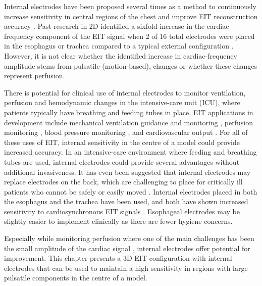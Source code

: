 

Internal electrodes have been proposed several times as a method to 
continuously increase sensitivity in central regions of the 
chest and improve EIT reconstruction 
accuracy \parencite{pilkington_utilization_1989,schuessler_utility_1995,nasehi_tehrani_evaluation_2012, 
czaplik_application_2014,nguyen_electrical_2020}.
Past research in 2D identified a sixfold increase in the cardiac frequency 
component of the EIT signal 
when 2 of 16 total electrodes were placed in the 
esophagus or trachea compared to a typical external configuration
\parencite{czaplik_application_2014}. However, it is not clear whether 
the identified increase in cardiac-frequency amplitude stems from pulsatile 
(motion-based), changes or whether these changes represent 
perfusion.

There is potential for clinical use of internal electrodes 
to monitor ventilation, perfusion and 
hemodynamic changes in the 
intensive-care unit (ICU), where patients typically have
breathing and feeding tubes in place.
EIT applications in development include mechanical ventilation 
guidance and monitoring \parencite{frerichs_chest_2017}, perfusion 
monitoring \parencite{frerichs_regional_2002,smit_electrical_2003}, 
blood pressure monitoring \parencite{sola_non-invasive_2011,proenca_noninvasive_2017}, 
and cardiovascular output \parencite{braun_accuracy_2018}. 
For all of these uses of EIT, internal sensitivity in the centre of 
a model could provide increased accuracy. 
In an 
intensive-care environment where feeding and breathing tubes 
are used, internal electrodes could provide 
several advantages without additional invasiveness. 
It has even been suggested that internal electrodes may replace 
electrodes on the back, which are challenging to place for critically 
ill patients who cannot be safely or easily 
moved \parencite{czaplik_application_2014}.
Internal electrodes placed in both the esophagus and the trachea
have been used, and both have shown increased sensitivity to cardiosynchronous
EIT signals \parencite{czaplik_application_2014}. 
Esophageal electrodes may be slightly easier to implement 
clinically as there are fewer hygiene concerns.

Especially while monitoring perfusion where one of the main challenges
has been the small amplitude of the cardiac signal
\parencite{nguyen_review_2012}, internal electrodes offer
potential for improvement.
This chapter presents a 3D EIT configuration with internal electrodes
that can be used to maintain a high sensitivity in regions with 
large pulsatile components in the centre of a model.

